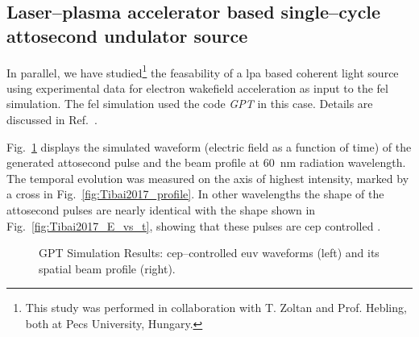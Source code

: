\subsection{Laser--plasma accelerator based single--cycle attosecond undulator source}
In parallel, we have studied\footnote{This study was performed in collaboration
with T. Zoltan and Prof. Hebling, both at Pecs University, Hungary.} the feasability of a \gls{lpa} based coherent light
source using experimental data for electron wakefield acceleration as input to
the \gls{fel} simulation. The \gls{fel} simulation used the code \textit{GPT} in this case.
Details are discussed in Ref.~\cite{Tibai2017}.

Fig.~\ref{fig:Tibai2017} displays the simulated waveform (electric field as
a function of time)  of the generated attosecond
pulse and the beam profile at \SI{60}{\nano\metre} radiation wavelength. The
temporal evolution was measured on the axis of highest intensity, marked by  a
cross in Fig.~\ref{fig:Tibai2017_profile}. In other
wavelengths the shape of the attosecond pulses are nearly identical with the
shape shown in Fig.~\ref{fig:Tibai2017_E_vs_t}, showing that these pulses are
\gls{cep} controlled \cite{Tibai2017}.
%
\begin{figure}[ht]
  \caption{GPT Simulation Results: \gls{cep}--controlled \gls{euv} waveforms (left) and its spatial beam
    profile (right).}
    \label{fig:Tibai2017}
\end{figure}
%
